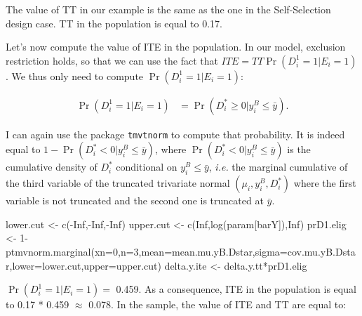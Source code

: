 \documentclass[
]{book}
\newenvironment{Shaded}{\begin{snugshade}}{\end{snugshade}}
\newcommand{\AttributeTok}[1]{\textcolor[rgb]{0.77,0.63,0.00}{#1}}
\newcommand{\ConstantTok}[1]{\textcolor[rgb]{0.00,0.00,0.00}{#1}}
\newcommand{\DecValTok}[1]{\textcolor[rgb]{0.00,0.00,0.81}{#1}}
\newcommand{\FunctionTok}[1]{\textcolor[rgb]{0.00,0.00,0.00}{#1}}
\newcommand{\NormalTok}[1]{#1}
\newcommand{\OtherTok}[1]{\textcolor[rgb]{0.56,0.35,0.01}{#1}}
\newcommand{\SpecialCharTok}[1]{\textcolor[rgb]{0.00,0.00,0.00}{#1}}
\newcommand{\StringTok}[1]{\textcolor[rgb]{0.31,0.60,0.02}{#1}}
\theoremstyle{definition}
\theoremstyle{definition}
\theoremstyle{definition}
\theoremstyle{definition}
\theoremstyle{remark}
\begin{document}
The value of TT in our example is the same as the one in the Self-Selection design case.
TT in the population is equal to 0.17.

Let's now compute the value of ITE in the population.
In our model, exclusion restriction holds, so that we can use the fact that \(ITE=TT\Pr(D^1_i=1|E_i=1)\).
We thus only need to compute \(\Pr(D^1_i=1|E_i=1)\):

\begin{align*}
  \Pr(D^1_i=1|E_i=1) & = \Pr(D_i^*\geq0|y_i^B\leq\bar{y}).
\end{align*}

I can again use the package \texttt{tmvtnorm} to compute that probability.
It is indeed equal to \(1-\Pr(D_i^*<0|y_i^B\leq\bar{y})\), where \(\Pr(D_i^*<0|y_i^B\leq\bar{y})\) is the cumulative density of \(D_i^*\) conditional on \(y_i^B\leq\bar{y}\), \textit{i.e.} the marginal cumulative of the third variable of the truncated trivariate normal \((\mu_i,y_i^B,D_i^*)\) where the first variable is not truncated and the second one is truncated at \(\bar{y}\).

\begin{Shaded}
\begin{Highlighting}[]
\NormalTok{lower.cut }\OtherTok{\textless{}{-}} \FunctionTok{c}\NormalTok{(}\SpecialCharTok{{-}}\ConstantTok{Inf}\NormalTok{,}\SpecialCharTok{{-}}\ConstantTok{Inf}\NormalTok{,}\SpecialCharTok{{-}}\ConstantTok{Inf}\NormalTok{)}
\NormalTok{upper.cut }\OtherTok{\textless{}{-}} \FunctionTok{c}\NormalTok{(}\ConstantTok{Inf}\NormalTok{,}\FunctionTok{log}\NormalTok{(param[}\StringTok{\textquotesingle{}barY\textquotesingle{}}\NormalTok{]),}\ConstantTok{Inf}\NormalTok{)}
\NormalTok{prD1.elig }\OtherTok{\textless{}{-}} \DecValTok{1}\SpecialCharTok{{-}}\FunctionTok{ptmvnorm.marginal}\NormalTok{(}\AttributeTok{xn=}\DecValTok{0}\NormalTok{,}\AttributeTok{n=}\DecValTok{3}\NormalTok{,}\AttributeTok{mean=}\NormalTok{mean.mu.yB.Dstar,}\AttributeTok{sigma=}\NormalTok{cov.mu.yB.Dstar,}\AttributeTok{lower=}\NormalTok{lower.cut,}\AttributeTok{upper=}\NormalTok{upper.cut)}
\NormalTok{delta.y.ite }\OtherTok{\textless{}{-}}\NormalTok{ delta.y.tt}\SpecialCharTok{*}\NormalTok{prD1.elig}
\end{Highlighting}
\end{Shaded}

\(\Pr(D^1_i=1|E_i=1)=\) 0.459.
As a consequence, ITE in the population is equal to 0.17 * 0.459 \(\approx\) 0.078.
In the sample, the value of ITE and TT are equal to:
\end{document}
